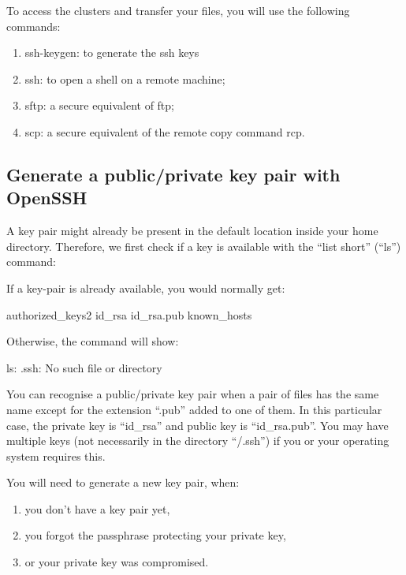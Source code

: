   To access the clusters and transfer your files, you will use the following commands:

  \begin{enumerate}
    \item  ssh-keygen: to generate the ssh keys
    \item  ssh: to open a shell on a remote machine;
    \item  sftp: a secure equivalent of ftp;
    \item  scp: a secure equivalent of the remote copy command rcp.
  \end{enumerate}

  \subsection{Generate a public/private key pair with OpenSSH}
  \label{sec:generate-key-pair-with-openssh}

  A key pair might already be present in the default location inside your home
  directory. Therefore, we first check if a key is available with the ``list
  short'' (``ls'')  command:

\begin{prompt}
\end{prompt}


  If a key-pair is already available, you would normally get:
\begin{prompt}
authorized_keys2    id_rsa            id_rsa.pub         known_hosts
\end{prompt}

  Otherwise, the command will show:

\begin{prompt}
ls: .ssh: No such file or directory
\end{prompt}

  You can recognise a public/private key pair when a pair of files has the same
  name except for the extension ``.pub'' added to one of them. In this particular
  case, the private key is ``id\_rsa'' and public key is ``id\_rsa.pub''. You may
  have multiple keys (not necessarily in the directory ``\tilde/.ssh'') if you or
  your operating system requires this.

  You will need to generate a new key pair, when:
  \begin{enumerate}
    \item  you don't have a key pair yet,
    \item  you forgot the passphrase protecting your private key,
    \item  or your private key was compromised.
  \end{enumerate}

